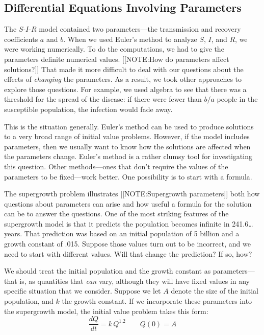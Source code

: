 \subsection{Differential Equations Involving Parameters}
\label{subsec:differential-equations-involving-parameters}

\label{DEs w/ params-begin}

The $S$-$I$-$R$ model contained two parameters---the transmission and
recovery coefficients $a$ and $b$. When we used
Euler's method to analyze $S$, $I$, and $R$, we were working
numerically.  To do the computations, we had to give the parameters
definite numerical values.
[[NOTE:How do parameters affect solutions?]]
That made it more difficult to deal with our questions about the
effects of {\em changing\/} the parameters.  As a result, we took
other approaches to explore those questions.  For example, we used
algebra to see that there was a threshold for the spread of the
disease: if there were fewer than $b/a$ people in the susceptible
population, the infection would fade away.

This is the situation generally.  Euler's method can be used to
produce solutions to a very broad range of initial value problems.
However, if the model includes parameters, then we usually want to
know how the solutions are affected when the parameters change.
Euler's method is a rather clumsy tool for investigating this
question.  Other methods---ones that don't require the values of the
parameters to be fixed---work better.  One possibility is to start
with a formula.



The supergrowth problem illustrates 
[[NOTE:Supergrowth parameters]]
both how questions about parameters can arise and how useful a formula
for the solution can be to answer the questions.  One of the most
striking features of the supergrowth model is that it predicts the
population becomes infinite in 241.6\ldots years.  That prediction was
based on an initial population of 5 billion and a growth constant of
.015.  Suppose those values turn out to be incorrect, and we need to
start with different values.  Will that change the prediction?  If so,
how?

We should treat the initial population and the growth constant as
parameters---that is, as quantities that {\em can\/} vary, although
they will have fixed values in any specific situation that we
consider.  Suppose we let $A$ denote the size of the initial
population, and $k$ the growth constant.  If we incorporate these
parameters into the supergrowth model, the initial value problem takes
this form:
	\[
\dfrac{dQ}{dt} = k\, Q^{1.2} \qquad Q(0) = A
\]


